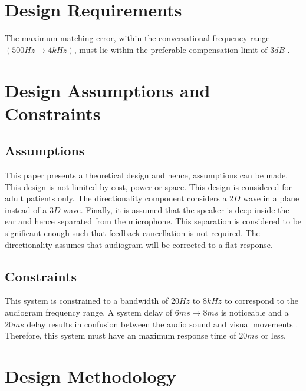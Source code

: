 \documentclass[11pt,onecolumn]{witseiepaper}
\begin{document}
\section{Design Requirements}

\noindent The maximum matching error, within the conversational frequency range $(500Hz \rightarrow 4kHz)$, must lie within the preferable compensation limit of $3dB$ \cite{chang}.

\section{Design Assumptions and Constraints}
\label{sec:assCons}

\subsection{Assumptions}

\noindent This paper presents a theoretical design and hence, assumptions can be made. This design is not limited by cost, power or space. This design is considered for adult patients only. The directionality component considers a $2D$ wave in a plane instead of a $3D$ wave. Finally, it is assumed that the speaker is deep inside the ear and hence separated from the microphone. This separation is considered to be significant enough such that feedback cancellation is not required. The directionality assumes that audiogram will be corrected to a flat response.

\subsection{Constraints}

\noindent This system is constrained to a bandwidth of $20Hz$ to $8kHz$ to correspond to the audiogram frequency range. A system delay of $6ms \rightarrow 8ms$ is noticeable and a $20ms$ delay results in confusion between the audio sound and visual movements \cite{brennan}. Therefore, this system must have an maximum response time of $20ms$ or less. 

\section{Design Methodology}
\end{document}
